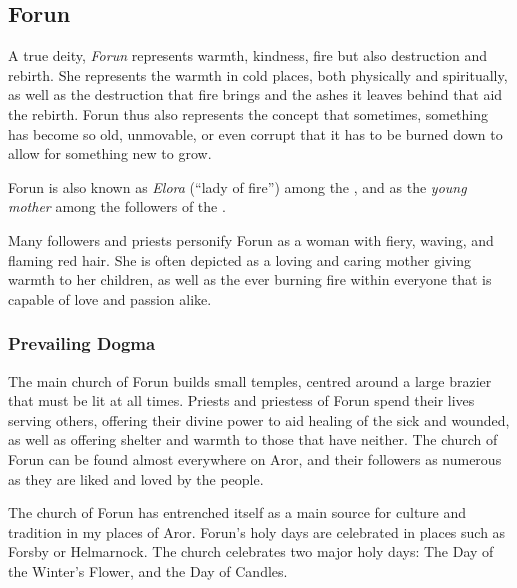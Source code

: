\clearpage
{}
\clearpage

\subsection{Forun}
\label{sec:Forun}

A true deity, \emph{Forun} represents warmth, kindness, fire but also
destruction and rebirth. She represents the warmth in cold places, both
physically and spiritually, as well as the destruction that fire brings and
the ashes it leaves behind that aid the rebirth. Forun thus also represents
the concept that sometimes, something has become so old, unmovable, or even
corrupt that it has to be burned down to allow for something new to grow.

Forun is also known as \emph{Elora} (``lady of fire'') among the
, and as the \emph{young mother} among the followers of
the .

Many followers and priests personify Forun as a woman with fiery, waving, and
flaming red hair. She is often depicted as a loving and caring mother giving
warmth to her children, as well as the ever burning fire within everyone that
is capable of love and passion alike.

\subsubsection{Prevailing Dogma}

The main church of Forun builds small temples, centred around a large brazier
that must be lit at all times. Priests and priestess of Forun spend their
lives serving others, offering their divine power to aid healing of the sick
and wounded, as well as offering shelter and warmth to those that have
neither. The church of Forun can be found almost everywhere on Aror, and their
followers as numerous as they are liked and loved by the people.

The church of Forun has entrenched itself as a main source for culture and
tradition in my places of Aror. Forun's holy days are celebrated in places
such as Forsby or Helmarnock. The church celebrates two major holy days: The
Day of the Winter's Flower, and the Day of Candles.

